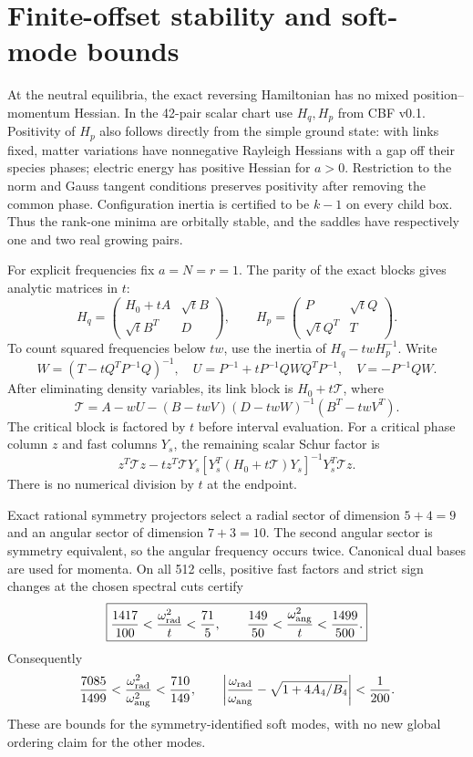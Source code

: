 \documentclass[11pt,a4paper]{article}
\begin{document}
\section{Finite-offset stability and soft-mode bounds}
At the neutral equilibria, the exact reversing Hamiltonian has no mixed position--momentum Hessian. In the 42-pair scalar chart use $H_q,H_p$ from CBF v0.1. Positivity of $H_p$ also follows directly from the simple ground state: with links fixed, matter variations have nonnegative Rayleigh Hessians with a gap off their species phases; electric energy has positive Hessian for $a>0$. Restriction to the norm and Gauss tangent conditions preserves positivity after removing the common phase. Configuration inertia is certified to be $k-1$ on every child box. Thus the rank-one minima are orbitally stable, and the saddles have respectively one and two real growing pairs.

For explicit frequencies fix $a=N=r=1$. The parity of the exact blocks gives analytic matrices in $t$:
\[
H_q=\begin{pmatrix}H_0+tA&\sqrt t B\\\sqrt t B^T&D\end{pmatrix},\qquad
H_p=\begin{pmatrix}P&\sqrt t Q\\\sqrt t Q^T&T\end{pmatrix}.
\]
To count squared frequencies below $tw$, use the inertia of $H_q-twH_p^{-1}$. Write
\[
W=(T-tQ^TP^{-1}Q)^{-1},\quad U=P^{-1}+tP^{-1}QWQ^TP^{-1},\quad V=-P^{-1}QW.
\]
After eliminating density variables, its link block is $H_0+t\mathcal T$, where
\[
\mathcal T=A-wU-(B-twV)(D-twW)^{-1}(B^T-twV^T).
\]
The critical block is factored by $t$ before interval evaluation. For a critical phase column $z$ and fast columns $Y_s$, the remaining scalar Schur factor is
\[
z^T\mathcal Tz-tz^T\mathcal TY_s
[Y_s^T(H_0+t\mathcal T)Y_s]^{-1}Y_s^T\mathcal Tz.
\]
There is no numerical division by $t$ at the endpoint.

Exact rational symmetry projectors select a radial sector of dimension $5+4=9$ and an angular sector of dimension $7+3=10$. The second angular sector is symmetry equivalent, so the angular frequency occurs twice. Canonical dual bases are used for momenta. On all 512 cells, positive fast factors and strict sign changes at the chosen spectral cuts certify
\[
\boxed{\frac{1417}{100}<\frac{\omega_{\rm rad}^2}{t}<\frac{71}{5},\qquad
\frac{149}{50}<\frac{\omega_{\rm ang}^2}{t}<\frac{1499}{500}.}
\]
Consequently
\[
\frac{7085}{1499}<\frac{\omega_{\rm rad}^2}{\omega_{\rm ang}^2}<\frac{710}{149},\qquad
\left|\frac{\omega_{\rm rad}}{\omega_{\rm ang}}-\sqrt{1+4A_4/B_4}\right|<\frac1{200}.
\]
These are bounds for the symmetry-identified soft modes, with no new global ordering claim for the other modes.
\newpage
\end{document}
